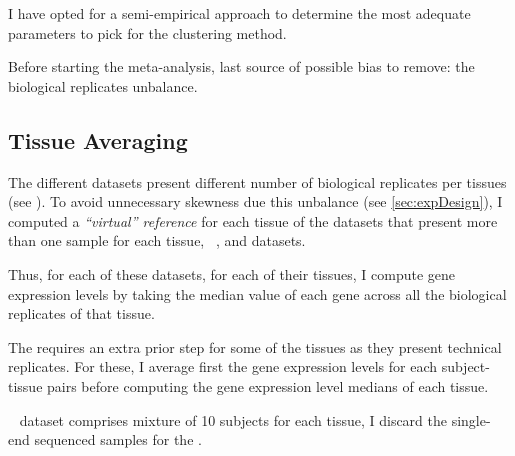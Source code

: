 

I have opted for
a semi-empirical approach to determine the most adequate parameters to pick for
the clustering method.


Before starting the meta-analysis, last source of possible bias to remove: the
biological replicates unbalance.

\subsection{Tissue Averaging}
The different datasets present different number of biological replicates per
tissues (see ). To avoid unnecessary skewness due this unbalance
(see \cref{sec:expDesign}), I computed a \emph{\enquote{virtual} reference} for
each tissue of the datasets that present more than one sample for each tissue,
\ie\ ,  and  datasets.

Thus, for each of these datasets, for each of their tissues, I compute gene
expression levels by taking the median value of each gene across all the
biological replicates of that tissue.

The  requires an extra prior step for some of the tissues as they
present technical replicates. For these, I average first the gene expression levels
for each subject-tissue pairs before computing the gene expression level medians
of each tissue.

\NB\  dataset comprises mixture of 10 subjects for each tissue, I
discard the single-end sequenced samples for the .


